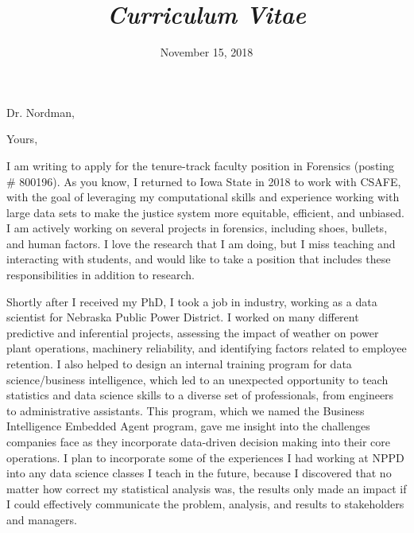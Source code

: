 \documentclass[12pt, letterpaper, sans]{moderncv}
\title{\emph{Curriculum Vitae}}
\begin{document}
\date{November 15, 2018}
\opening{Dr. Nordman,}
\closing{Yours,}
\makelettertitle

I am writing to apply for the tenure-track faculty position in Forensics (posting \# 800196). As you know, I returned to Iowa State in 2018 to work with CSAFE, with the goal of leveraging my computational skills and experience working with large data sets to make the justice system more equitable, efficient, and unbiased. I am actively working on several projects in forensics, including shoes, bullets, and human factors. I love the research that I am doing, but I miss teaching and interacting with students, and would like to take a position that includes these responsibilities in addition to research. 

Shortly after I received my PhD, I took a job in industry, working as a data scientist for Nebraska Public Power District. I worked on many different predictive and inferential projects, assessing the impact of weather on power plant operations, machinery reliability, and identifying factors related to employee retention. I also helped to design an internal training program for data science/business intelligence, which led to an unexpected opportunity to teach statistics and data science skills to a diverse set of professionals, from engineers to administrative assistants. This program, which we named the Business Intelligence Embedded Agent program, gave me insight into the challenges companies face as they incorporate data-driven decision making into their core operations. I plan to incorporate some of the experiences I had working at NPPD into any data science classes I teach in the future, because I discovered that no matter how correct my statistical analysis was, the results only made an impact if I could effectively communicate the problem, analysis, and results to stakeholders and managers.  
\end{document}
